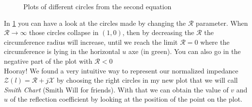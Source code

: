 \begin{figure}[H]
    \begin{center}
    \end{center}\caption{Plots of different circles from the second equation}\label{fig:y_cicles} 
\end{figure}
In \cref{fig:y_cicles} you can have a look at the circles made by changing the $\mathcal{R}$ parameter. When $\mathcal{R}\rightarrow \infty$ those circles collapse in $(1,0)$, then by decreasing the $\mathcal{R}$ the circumference radius will increase, until we reach the limit $\mathcal{R}=0$ where the circumference is lying in the horizontal $u$ axe (in green). You can also go in the negative part of the plot with $\mathcal{R}<0$\\
Hooray! We found a very intuitive way to represent our normalized impedance $\mathcal{Z} (l) = \mathcal{R}+j\mathcal{X}$ by choosing the right circles in my new plot that we will call \emph{Smith Chart} (Smith Will for friends). With that we can obtain the value of $v$ and $u$ of the reflection coefficient by looking at the position of the point on the plot. 
